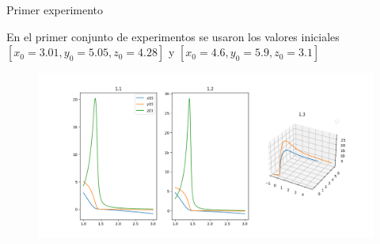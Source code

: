 \documentclass{beamer}
\begin{document}
\begin{frame}
    {Primer experimento}

    En el primer conjunto de experimentos se usaron los valores iniciales $[x_0=3.01, y_0=5.05, z_0=4.28]$
    y $[x_0=4.6, y_0=5.9, z_0=3.1]$

    \begin{figure}[h!]
        \includegraphics[width=\linewidth]{./images/1.png}
    \end{figure}
\end{frame}
\end{document}
